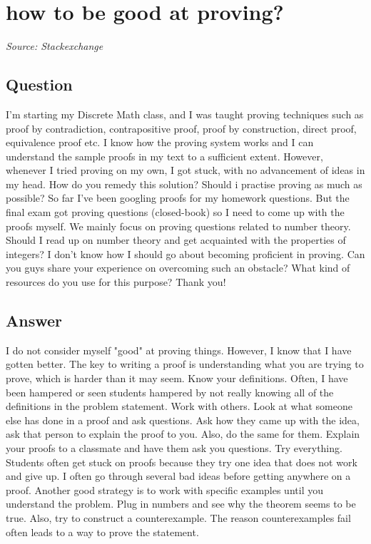 \documentclass{article}
\begin{document}
\newpage

\section{how to be good at proving?}
\textit{Source: Stackexchange}

\subsection*{Question}
I'm starting my Discrete Math class, and I was taught proving techniques such as proof by contradiction, contrapositive proof, proof by construction, direct proof, equivalence proof etc. I know how the proving system works and I can understand the sample proofs in my text to a sufficient extent. However, whenever I tried proving on my own, I got stuck, with no advancement of ideas in my head. How do you remedy this solution? Should i practise proving as much as possible? So far I've been googling proofs for my homework questions. But the final exam got proving questions (closed-book) so I need to come up with the proofs myself. We mainly focus on proving questions related to number theory. Should I read up on number theory and get acquainted with the properties of integers? I don't know how I should go about becoming proficient in proving. Can you guys share your experience on overcoming such an obstacle? What kind of resources do you use for this purpose? Thank you!

\subsection*{Answer}
I do not consider myself "good" at proving things. However, I know that I have gotten better. The key to writing a proof is understanding what you are trying to prove, which is harder than it may seem. Know your definitions. Often, I have been hampered or seen students hampered by not really knowing all of the definitions in the problem statement. Work with others. Look at what someone else has done in a proof and ask questions. Ask how they came up with the idea, ask that person to explain the proof to you. Also, do the same for them. Explain your proofs to a classmate and have them ask you questions. Try everything. Students often get stuck on proofs because they try one idea that does not work and give up. I often go through several bad ideas before getting anywhere on a proof. Another good strategy is to work with specific examples until you understand the problem. Plug in numbers and see why the theorem seems to be true. Also, try to construct a counterexample. The reason counterexamples fail often leads to a way to prove the statement.
\end{document}
